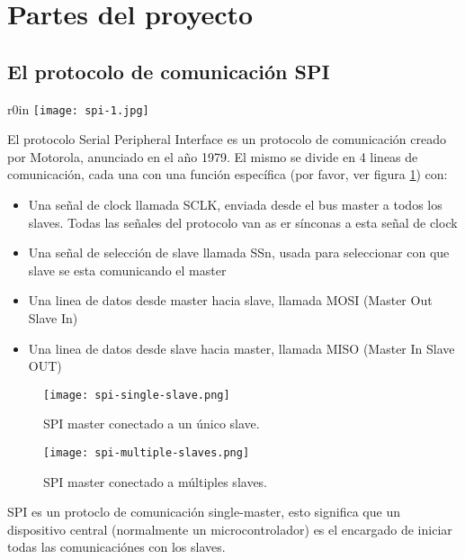 \documentclass[../informe_krapp.tex]{subfiles}
\begin{document}
\section{Partes del proyecto}
\subsection{El protocolo de comunicación SPI}
\begin{wrapfigure}{r}{0in}
	\centering
	\texttt{[image: spi-1.jpg]}
\end{wrapfigure}

El protocolo Serial Peripheral Interface es un protocolo de comunicación creado por
Motorola, anunciado en el año 1979.
El mismo se divide en 4 lineas de comunicación, cada una con una función específica
(por favor, ver figura \ref{spi-single-slave}) con:

\begin{itemize}
	\item Una señal de clock llamada SCLK, enviada desde el bus master a todos los slaves.
	      Todas las señales del protocolo van as er sínconas a esta señal de clock
	\item Una señal de selección de slave llamada SSn, usada para seleccionar con
	      que slave se esta comunicando el master
	\item Una linea de datos desde master hacia slave, llamada MOSI (Master Out Slave In)
	\item Una linea de datos desde slave hacia master, llamada MISO (Master In Slave OUT)
\end{itemize}

\begin{figure}[H]
	\centering
	\texttt{[image: spi-single-slave.png]}
	\caption{SPI master conectado a un único slave.}
	\label{spi-single-slave}
\end{figure}

\begin{figure}[H]
	\centering
	\texttt{[image: spi-multiple-slaves.png]}
	\caption{SPI master conectado a múltiples slaves.}
	\label{spi-multiple-slaves}
\end{figure}


\clearpage

SPI es un protoclo de comunicación single-master, esto significa que un dispositivo
central (normalmente un microcontrolador) es el encargado de iniciar todas
las comunicaciónes con los slaves.
\end{document}
